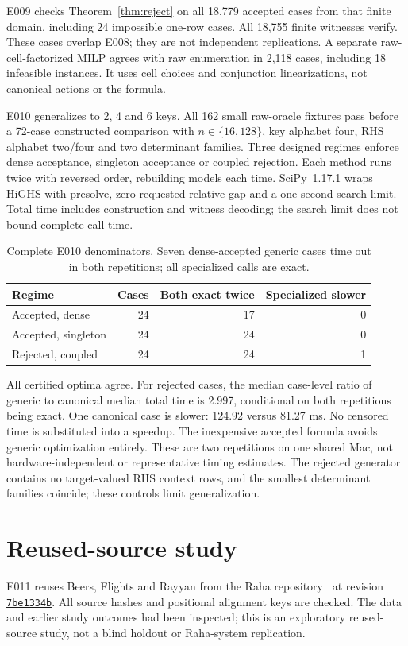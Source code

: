\documentclass[11pt]{article}
\begin{document}
E009 checks Theorem~\ref{thm:reject} on all 18,779 accepted cases from that finite
domain, including 24 impossible one-row cases. All 18,755 finite witnesses
verify. These cases overlap E008; they are not independent replications.
A separate raw-cell-factorized MILP agrees with raw enumeration in 2,118 cases,
including 18 infeasible instances. It uses cell choices and conjunction
linearizations, not canonical actions or the formula.

E010 generalizes to 2, 4 and 6 keys. All 162 small raw-oracle fixtures pass
before a 72-case constructed comparison with $n\in\{16,128\}$, key alphabet
four, RHS alphabet two/four and two determinant families. Three designed
regimes enforce dense acceptance, singleton acceptance or coupled rejection.
Each method runs twice with reversed order, rebuilding models each time.
SciPy~1.17.1 wraps HiGHS with presolve, zero requested relative gap and a
one-second search limit. Total time includes construction and witness decoding;
the search limit does not bound complete call time.

\begin{table}[H]
\centering\small
\begin{tabular}{lrrr}
\toprule
Regime & Cases & Both exact twice & Specialized slower\\
\midrule
Accepted, dense &24&17&0\\
Accepted, singleton &24&24&0\\
Rejected, coupled &24&24&1\\
\bottomrule
\end{tabular}
\caption{Complete E010 denominators. Seven dense-accepted generic cases time
out in both repetitions; all specialized calls are exact.}
\end{table}

All certified optima agree. For rejected cases, the median case-level ratio
of generic to canonical median total time is 2.997, conditional on both
repetitions being exact. One canonical case is slower: 124.92 versus 81.27 ms.
No censored time is substituted into a speedup. The inexpensive accepted
formula avoids generic optimization entirely. These are two repetitions on one
shared Mac, not hardware-independent or representative timing estimates.
The rejected generator contains no target-valued RHS context rows, and the
smallest determinant families coincide; these controls limit generalization.

\section{Reused-source study}
E011 reuses Beers, Flights and Rayyan from the Raha repository~\cite{raha} at
revision \href{https://github.com/BigDaMa/raha/tree/7be1334b8c7bbdac3f47ef514fb3e1e8c5fc181c}{\texttt{7be1334b}}.
All source hashes and positional alignment keys are checked. The data and
earlier study outcomes had been inspected; this is an exploratory reused-source
study, not a blind holdout or Raha-system replication.
\end{document}
